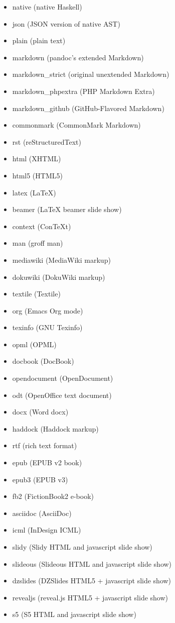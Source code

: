 \documentclass[journal,10pt,final]{IEEEtran}
\providecommand{\tightlist}{%
  \setlength{\itemsep}{0pt}\setlength{\parskip}{0pt}}
\begin{document}
\begin{itemize}
\tightlist
\item
  native (native Haskell)
\item
  json (JSON version of native AST)
\item
  plain (plain text)
\item
  markdown (pandoc's extended Markdown)
\item
  markdown\_strict (original unextended Markdown)
\item
  markdown\_phpextra (PHP Markdown Extra)
\item
  markdown\_github (GitHub-Flavored Markdown)
\item
  commonmark (CommonMark Markdown)
\item
  rst (reStructuredText)
\item
  html (XHTML)
\item
  html5 (HTML5)
\item
  latex (LaTeX)
\item
  beamer (LaTeX beamer slide show)
\item
  context (ConTeXt)
\item
  man (groff man)
\item
  mediawiki (MediaWiki markup)
\item
  dokuwiki (DokuWiki markup)
\item
  textile (Textile)
\item
  org (Emacs Org mode)
\item
  texinfo (GNU Texinfo)
\item
  opml (OPML)
\item
  docbook (DocBook)
\item
  opendocument (OpenDocument)
\item
  odt (OpenOffice text document)
\item
  docx (Word docx)
\item
  haddock (Haddock markup)
\item
  rtf (rich text format)
\item
  epub (EPUB v2 book)
\item
  epub3 (EPUB v3)
\item
  fb2 (FictionBook2 e-book)
\item
  asciidoc (AsciiDoc)
\item
  icml (InDesign ICML)
\item
  slidy (Slidy HTML and javascript slide show)
\item
  slideous (Slideous HTML and javascript slide show)
\item
  dzslides (DZSlides HTML5 + javascript slide show)
\item
  revealjs (reveal.js HTML5 + javascript slide show)
\item
  s5 (S5 HTML and javascript slide show)
\end{itemize}
\end{document}
